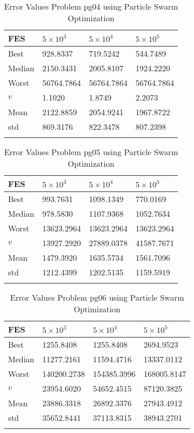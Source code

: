 \documentclass[10pt, a4paper]{book}
\begin{document}
\begin{center}
\begin{longtable}{l l l l}
FES & $5 \times 10^{3}$ & $5 \times 10^{4}$ & $5 \times 10^{5}$ \\
\hline
Best & 928.8337 & 719.5242 & 544.7489 \\
Median & 2150.3431 & 2005.8107 & 1924.2220 \\
Worst & 56764.7864 & 56764.7864 & 56764.7864 \\
$v$ & 1.1020 & 1.8749 & 2.2073 \\
Mean & 2122.8859 & 2054.9241 & 1967.8722 \\
std & 869.3176 & 822.3478 & 807.2398 \\
\caption{ Error Values Problem pg04 using Particle Swarm Optimization }
\end{longtable}
\end{center}

\begin{center}
\begin{longtable}{l l l l}
FES & $5 \times 10^{3}$ & $5 \times 10^{4}$ & $5 \times 10^{5}$ \\
\hline
Best & 993.7631 & 1098.1349 & 770.0169 \\
Median & 978.5830 & 1107.9368 & 1052.7634 \\
Worst & 13623.2964 & 13623.2964 & 13623.2964 \\
$v$ & 13927.2920 & 27889.0378 & 41587.7671 \\
Mean & 1479.3920 & 1635.5734 & 1561.7096 \\
std & 1212.4399 & 1202.5135 & 1159.5919 \\
\caption{ Error Values Problem pg05 using Particle Swarm Optimization }
\end{longtable}
\end{center}

\begin{center}
\begin{longtable}{l l l l}
FES & $5 \times 10^{3}$ & $5 \times 10^{4}$ & $5 \times 10^{5}$ \\
\hline
Best & 1255.8408 & 1255.8408 & 2694.9523 \\
Median & 11277.2161 & 11594.4716 & 13337.0112 \\
Worst & 140200.2738 & 154385.3996 & 168005.8147 \\
$v$ & 23954.6020 & 54652.4515 & 87120.3825 \\
Mean & 23886.3318 & 26892.3376 & 27943.4912 \\
std & 35652.8441 & 37113.8315 & 38943.2701 \\
\caption{ Error Values Problem pg06 using Particle Swarm Optimization }
\end{longtable}
\end{center}
\end{document}
